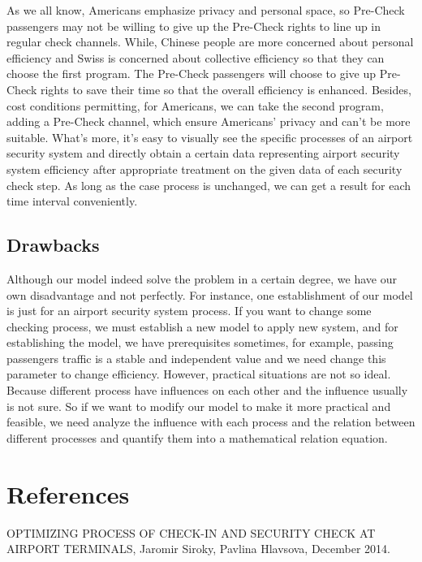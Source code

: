 \documentclass[12pt]{article}
\begin{document}
\setlength{\parindent}{2em}
As we all know, Americans emphasize privacy and personal space, so Pre-Check passengers may not be willing to give up the Pre-Check rights to line up in regular check channels. While, Chinese people are more concerned about personal efficiency and Swiss is concerned about collective efficiency so that they can choose the first program. The Pre-Check passengers will choose to give up Pre-Check rights to save their time so that the overall efficiency is enhanced. Besides, cost conditions permitting, for Americans, we can take the second program, adding a Pre-Check channel, which ensure Americans' privacy and can't be more suitable.
What's more, it's easy to visually see the specific processes of an airport security system and directly obtain a certain data representing airport security system efficiency after appropriate treatment on the given data of each security check step.
As long as the case process is unchanged, we can get a result for each time interval conveniently.
\subsection{Drawbacks}

\setlength{\parindent}{2em}
Although our model indeed solve the problem in a certain degree, we have our own disadvantage and not perfectly. For instance, one establishment of our model is just for an airport security system process. If you want to change some checking process, we must establish a new model to apply new system, and for establishing the model, we have prerequisites sometimes, for example, passing passengers traffic is a stable and independent value and we need change this parameter to change efficiency. However, practical situations are not so ideal.
Because different process have influences on each other and the influence usually is not sure. So if we want to modify our model to make it more practical and feasible, we need analyze the influence with each process and the relation between different processes and quantify them into a mathematical relation equation.

\section{References}





\begin{thebibliography}{30}
OPTIMIZING PROCESS OF CHECK-IN AND SECURITY
CHECK AT AIRPORT TERMINALS, Jaromir Siroky, Pavlina Hlavsova, December 2014.
\end{thebibliography}
\end{document}
